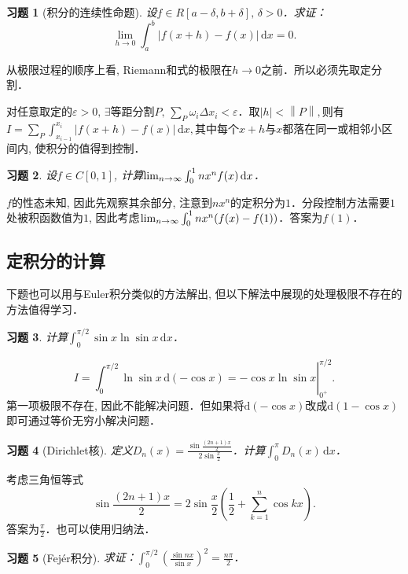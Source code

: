 \documentclass[11pt,a4paper]{ctexart}
\makeatletter
\theoremstyle{thmseries} %
\theoremstyle{exerseries}
\newtheorem{exer}{习题}[section]
\renewenvironment{proof}[1][\proofname]{\par
  \pushQED{\qed}%
  \normalfont \topsep6\p@\@plus6\p@\relax
  \trivlist
  \item[\hskip\labelsep
        \itshape
    #1\@addpunct{}]\ignorespaces
}{%
  \popQED\endtrivlist\@endpefalse
}
\newenvironment{sol}{\begin{proof}[\bfseries\upshape 解\quad]}{\end{proof}}
\newenvironment{pf}{\begin{proof}[\bfseries\upshape 证\quad]}{\end{proof}}
\newcommand{\bra}[1]{\mathopen{}\left(#1\right)}
\renewcommand{\epsilon}{\varepsilon}
\renewcommand{\d}{\mathrm{d}}
\def \nti {\mathnormal{n}\to\infty}
\newcommand{\norm}[1]{\left\lVert #1 \right\rVert}
\makeatother
\begin{document}
\begin{exer}[积分的连续性命题]
	设$f\in R[a-\delta,b+\delta],\,\delta>0$．求证：
	\[\lim_{h\to0}\int_{a}^{b}|f(x+h)-f(x)|\,\d x=0.\]
\end{exer}
\begin{pf}
	从极限过程的顺序上看, Riemann和式的极限在$h\to0$之前．所以必须先取定分割．
	
	对任意取定的$\epsilon>0,\,\exists$等距分割$P,\,\sum_{P}\omega_i\Delta x_i<\epsilon$．取$|h|<\norm{P},$则有
	$I=\sum_{P}\int_{x_{i-1}}^{x_i}|f(x+h)-f(x)|\,\d x,$其中每个$x+h$与$x$都落在同一或相邻小区间内, 使积分的值得到控制．
\end{pf}

\begin{exer}
	设$f\in C[0,1]$, 计算$\lim_{\nti}\int_{0}^{1}nx^nf(x)\,\d x$．
\end{exer}
\begin{sol}
	$f$的性态未知, 因此先观察其余部分, 注意到$nx^n$的定积分为$1$．分段控制方法需要$1$处被积函数值为$1$, 因此考虑$\lim_{\nti}\int_{0}^{1}nx^n\bra{f(x)-f(1)}$．答案为$f(1)$．
\end{sol}


\subsection{定积分的计算}
下题也可以用与Euler积分类似的方法解出, 但以下解法中展现的处理极限不存在的方法值得学习．
\begin{exer}
	计算$\int_{0}^{\pi/2}\sin x\ln\sin x\,\d x$．
\end{exer}
\begin{sol}
	\[\left.I=\int_{0}^{\pi/2}\ln\sin x\,\d(-\cos x)=-\cos x\ln\sin x\right|_{0^+}^{\pi/2}.\]
	第一项极限不存在, 因此不能解决问题．但如果将$\d(-\cos x)$改成$\d(1-\cos x)$即可通过等价无穷小解决问题．
\end{sol}

\begin{exer}[Dirichlet核]
	定义$D_n(x)=\frac{\sin\frac{(2n+1)x}{2}}{2\sin\frac{x}{2}}$．计算$\int_{0}^{\pi}D_n(x)\,\d x$．
\end{exer}
\begin{sol}
	考虑三角恒等式
	\[\sin\frac{(2n+1)x}{2}=2\sin\frac{x}{2}\bra{\frac{1}{2}+\sum_{k=1}^{n}\cos kx}.\]
	答案为$\frac{\pi}{2}$．也可以使用归纳法．
\end{sol}

\begin{exer}[Fejér积分]
	求证：$\int_{0}^{\pi/2}\bra{\frac{\sin nx}{\sin x}}^2=\frac{n\pi}{2}$．
\end{exer}
\end{document}
